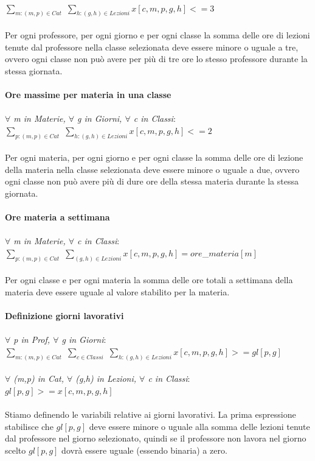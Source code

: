 \documentclass{article}
\begin{document}
	\\$\sum_{m : (m,p) \in Cat}$ $\sum_{h : (g,h) \in Lezioni}x[c,m,p,g,h] <= 3$
\\\\Per ogni professore, per ogni giorno e per ogni classe la somma delle ore di lezioni tenute dal professore nella classe selezionata deve essere minore o uguale a tre, ovvero ogni classe non può avere per più di tre ore lo stesso professore durante la stessa giornata.
\\\\\textbf{Ore massime per materia in una classe}
	\\\\\emph{$\forall$ m in Materie, $\forall$ g in Giorni, $\forall$ c in Classi}:
	\\$\sum_{p : (m,p) \in Cat}$ $\sum_{h : (g,h) \in Lezioni}x[c,m,p,g,h] <= 2$
\\\\Per ogni materia, per ogni giorno e per ogni classe la somma delle ore di lezione della materia nella classe selezionata deve essere minore o uguale a due, ovvero ogni classe non può avere più di dure ore della stessa materia durante la stessa giornata.
\\\\\textbf{Ore materia a settimana}
	\\\\\emph{$\forall$ m in Materie, $\forall$ c in Classi}:
	\\$\sum_{p : (m,p) \in Cat}$ $\sum_{(g,h) \in Lezioni}x[c,m,p,g,h] = ore$\_$materia[m]$
\\\\Per ogni classe e per ogni materia la somma delle ore totali a settimana della materia deve essere uguale al valore stabilito per la materia.
\\\\\textbf{Definizione giorni lavorativi}
	\\\\\emph{$\forall$ p in Prof, $\forall$ g in Giorni}:
	\\ $\sum_{m : (m,p) \in Cat}$ $\sum_{c \in Classi}$ $\sum_{h : (g,h) \in Lezioni}x[c,m,p,g,h] >= gl[p,g]$
		\\\\\emph{$\forall$ (m,p) in Cat, $\forall$ (g,h) in Lezioni, $\forall$ c in Classi}:
	\\$gl[p,g] >= x[c,m,p,g,h]$
\\\\Stiamo definendo le variabili relative ai giorni lavorativi. La prima espressione stabilisce che $gl[p,g]$ deve essere minore o uguale alla somma delle lezioni tenute dal professore nel giorno selezionato, quindi se il professore non lavora nel giorno scelto $gl[p,g]$ dovrà essere uguale (essendo binaria) a zero.
\end{document}
